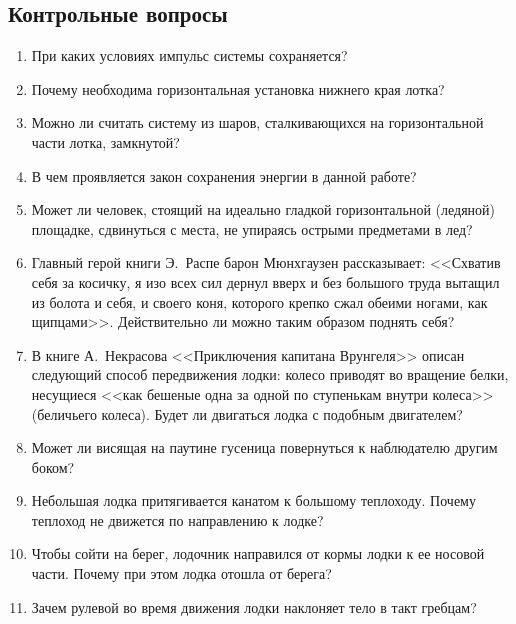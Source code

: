\documentclass[a4paper, 12pt]{extarticle}
\begin{document}
\subsection{Контрольные вопросы}
\begin{enumerate}
 \item При каких условиях импульс системы сохраняется?
 \item Почему необходима горизонтальная установка нижнего края лотка?
 \item
  Можно ли считать систему из шаров, сталкивающихся на горизонтальной части лотка, замкнутой?
  \item  %
   В чем проявляется закон сохранения энергии в данной работе?
   \item Может ли человек, стоящий на идеально гладкой горизонтальной (ледяной) площадке, сдвинуться с места, не упираясь острыми предметами в лед?  %
   \item Главный герой книги Э.~Распе барон Мюнхгаузен рассказывает: <<Схватив себя за косичку, я изо всех сил дернул вверх и без большого труда вытащил из болота и себя, и своего коня, которого крепко сжал обеими ногами, как щипцами>>. Действительно ли можно таким образом поднять себя?
   \item В книге А.~Некрасова <<Приключения капитана Врунгеля>> описан следующий способ передвижения лодки: колесо приводят во вращение белки, несущиеся <<как бешеные одна за одной по ступенькам внутри колеса>> (беличьего колеса). Будет ли двигаться лодка с подобным двигателем? %
   \item Может ли висящая на паутине гусеница повернуться к наблюдателю другим боком?
   \item Небольшая лодка притягивается канатом к большому теплоходу. Почему теплоход не движется по направлению к лодке? %
   \item Чтобы сойти на берег, лодочник направился от кормы лодки к ее носовой части. Почему при этом лодка отошла от берега?
   \item Зачем рулевой во время движения лодки наклоняет тело в такт гребцам? %
\end{enumerate}
\end{document}
